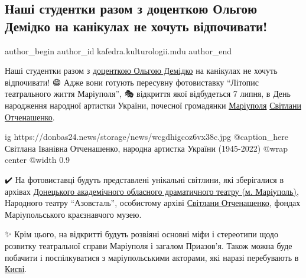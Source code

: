  
 
 
 
 
 
\subsection{Наші студентки разом з доценткою Ольгою Демідко на канікулах не хочуть відпочивати!}
\label{sec:30_06_2023.fb.kafedra.kulturologii.mdu.1.nashi_studentky_razom_iz_docent_demidko}
 
\ifcmt
 author_begin
   author_id kafedra.kulturologii.mdu
 author_end
\fi

Наші студентки разом з \href{\urlDemidkoIA}{доценткою Ольгою Демідко} на канікулах не хочуть
відпочивати! 😁 Адже вони готують пересувну фотовиставку \enquote{Літопис
театрального життя Маріуполя}, 🎭 відкриття якої відбудеться 7 липня, в День
народження народної артистки України, почесної громадянки
\href{\urlMariupolIA}{Маріуполя}
\href{\urlSvitlanaIvanivnaOtchenashenkoIA}{Світлани Отченашенко}.

\ifcmt
  ig https://donbas24.news/storage/news/wcgdhigcoz6vx38c.jpg
	@caption_here Світлана Іванівна Отченашенко, народна артистка України (1945-2022)
  @wrap center
  @width 0.9
\fi

✔️ На фотовиставці будуть представлені унікальні світлини, які зберігалися в
архівах \href{\urlMariupolDramTeatrIA}{Донецького академічного обласного драматичного театру (м. Маріуполь)},
Народного театру \enquote{Азовсталь}, особистому архіві \href{\urlSvitlanaIvanivnaOtchenashenkoIA}{Світлани Отченашенко}, фондах
Маріупольського краєзнавчого музею.

✨️ Крім цього, на відкритті будуть розвіяні основні міфи і стереотипи щодо
розвитку театральної справи Маріуполя і загалом Приазов'я. Також можна буде
побачити і поспілкуватися з маріупольськими акторами, які наразі перебувають в
\href{\urlKyivIA}{Києві}.🥰

